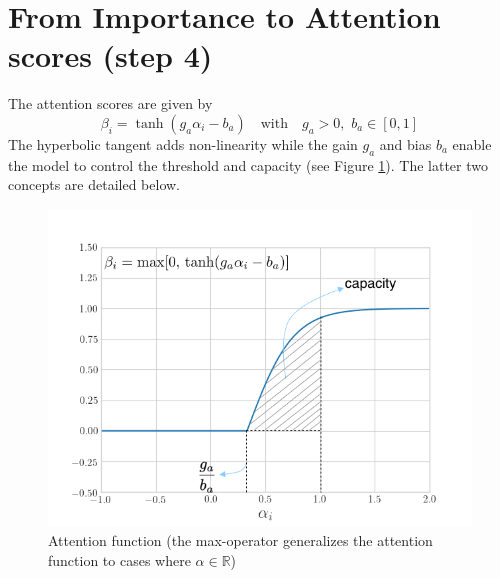 
\section{From Importance to Attention scores (step 4)}\label{sec:capacity}
The attention scores are given by
\begin{equation}
\beta_i = \tanh(g_a\alpha_i - b_a) \quad \text{with} \quad g_a > 0,\,\,b_a\in [0,1]
\end{equation}
The hyperbolic tangent adds non-linearity while the gain $g_a$ and bias $b_a$ enable the model to control the threshold and capacity (see Figure \ref{fig:attention-function}). The latter two concepts are detailed below.
\begin{figure}[!h]
\centering
\includegraphics[scale=0.5]{figures/tanh-annotated}
\caption[Attention function]{Attention function (the max-operator generalizes the attention function to cases where $\alpha \in \mathbb{R}$)}
\label{fig:attention-function}
\end{figure}

